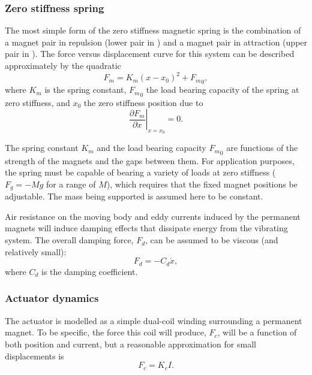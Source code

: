 \subsubsection{Zero stiffness spring}

The most simple form of the zero stiffness magnetic spring is the
combination of a magnet pair in repulsion (lower pair in
) and a magnet pair in attraction (upper pair in
). The force versus displacement curve for this
system can be described approximately by the quadratic~\cite{robertson2006}
\begin{equation}
  F_m = K_m(x-x_0)^2+{F_m}_0 ,
\end{equation}
where $K_m$ is the spring constant, ${F_m}_0$ the load bearing
capacity of the spring at zero stiffness, and $x_0$ the zero
stiffness position due to
\begin{equation}
  \left.\frac{\partial F_m}{\partial x}\right|_{x=x_0}=0 .
\end{equation}

The spring constant $K_m$ and the load bearing capacity ${F_m}_0$ are
functions of the strength of the magnets and the gaps between them. For
application purposes, the spring must be capable of bearing a variety
of loads at zero stiffness ($F_g=-Mg$ for a range of $M$), which
requires that the fixed magnet positions be adjustable. The mass being
supported is assumed here to be constant.

Air resistance on the moving body and eddy currents induced by the
permanent magnets will induce damping effects that dissipate energy
from the vibrating system. The overall damping force, $F_d$, can be
assumed to be viscous (and relatively small):
\begin{equation}
  F_d = -C_d\dot x ,
\end{equation}
where $C_d$ is the damping coefficient.

\subsubsection{Actuator dynamics}

The actuator is modelled as a simple dual-coil winding
surrounding a permanent magnet. To be specific, the force this coil
will produce, $F_c$, will be a function of both position and current, but a
reasonable approximation for small displacements is
\begin{equation}
  F_c = K_cI.
\end{equation}

